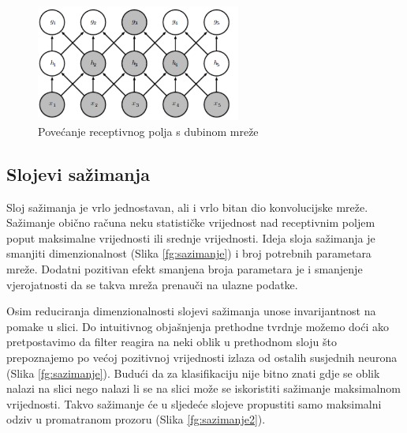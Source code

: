 \documentclass[times, utf8, proizvoljni, numeric]{fer}
\begin{document}
\begin{figure}[!ht]
	\begin{center}
		\captionsetup{justification=centering}
		\includegraphics[width=0.6\textwidth]{./imgs/receptivno_polje.png}
		\caption{Povećanje receptivnog polja s dubinom mreže  \cite{deeplearningbook}}
		\label{fg:receptivno_polje}
	\end{center}
\end{figure}

\subsection{Slojevi sažimanja}

Sloj sažimanja je vrlo jednostavan, ali i vrlo bitan dio konvolucijske mreže. Sažimanje obično računa neku statističke vrijednost nad receptivnim poljem poput maksimalne vrijednosti ili srednje vrijednosti. Ideja sloja sažimanja je smanjiti dimenzionalnost (Slika \ref{fg:sazimanje}) i broj potrebnih parametara mreže. Dodatni pozitivan efekt smanjena broja parametara je i smanjenje vjerojatnosti da se takva mreža prenauči na ulazne podatke.

Osim reduciranja dimenzionalnosti slojevi sažimanja unose invarijantnost na pomake u slici. Do intuitivnog objašnjenja prethodne tvrdnje možemo doći ako pretpostavimo da filter reagira na neki oblik u prethodnom sloju što prepoznajemo po većoj pozitivnoj vrijednosti izlaza od ostalih susjednih neurona (Slika \ref{fg:sazimanje}). Budući da za klasifikaciju nije bitno znati gdje se oblik nalazi na slici nego nalazi li se na slici može se iskoristiti sažimanje maksimalnom vrijednosti. Takvo sažimanje će u sljedeće slojeve propustiti samo maksimalni odziv u promatranom prozoru (Slika \ref{fg:sazimanje2}).
\end{document}
